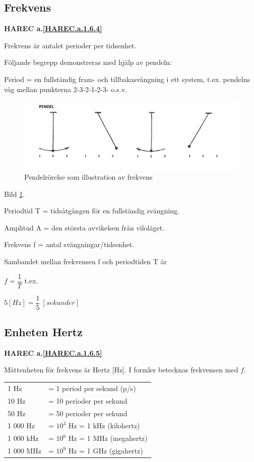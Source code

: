 \subsection{Frekvens}
\textbf{HAREC a.\ref{HAREC.a.1.6.4}\label{myHAREC.a.1.6.4}}

Frekvens är antalet perioder per tidsenhet.

Följande begrepp demonstreras med hjälp av pendeln:

Period = en fullständig fram- och tillbakasvängning i ett system, t.ex.
pendelns väg mellan punkterna 2-3-2-1-2-3- o.s.v.

\begin{figure}[h]
\includegraphics[width=\textwidth]{images/cropped_pdfs/bild_2_1-33.pdf}
\caption{Pendelrörelse som illustration av frekvens}
\label{fig:BildII1-33}
\end{figure}

Bild \ref{fig:BildII1-33}.

Periodtid T = tidsåtgången för en fullständig svängning.

Amplitud A = den största avvikelsen från viloläget.

Frekvens f = antal svängningar/tidsenhet.

Sambandet mellan frekvensen f och periodtiden T är

\(f=\dfrac{1}{T}\) t.ex.

\(5 [H z] = \dfrac{1}{5}\ [sekunder]\)

\subsection{Enheten Hertz}
\textbf{HAREC a.\ref{HAREC.a.1.6.5}\label{myHAREC.a.1.6.5}}

Måttenheten för frekvens är Hertz [Hz].
I formler betecknas frekvensen med \(f\).

\begin{center}
\begin{tabular}{ll}
1 Hz      & = 1 period per sekund (p/s) \\
10 Hz     & = 10 perioder per sekund \\
50 Hz     & = 50 perioder per sekund \\
1 000 Hz  & = \(10^3\) Hz = 1 kHz (kilohertz) \\
1 000 kHz & = \(10^6\) Hz = 1 MHz (megahertz) \\
1 000 MHz & = \(10^9\) Hz = 1 GHz (gigahertz) \\
\end{tabular}
\end{center}

